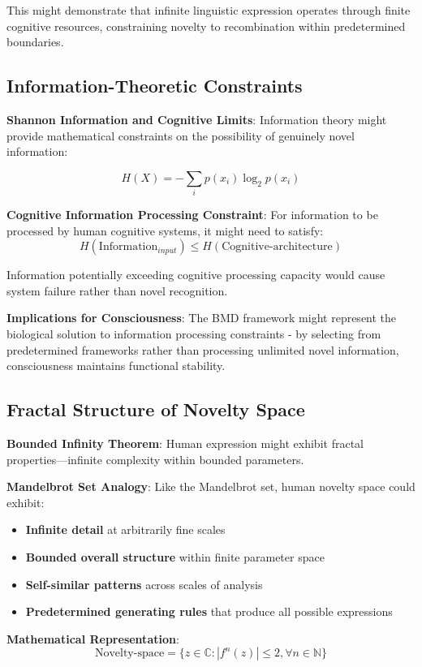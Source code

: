 \documentclass[12pt]{article}
\begin{document}
This might demonstrate that infinite linguistic expression operates through finite cognitive resources, constraining novelty to recombination within predetermined boundaries.

\subsection{Information-Theoretic Constraints}

\textbf{Shannon Information and Cognitive Limits}: Information theory might provide mathematical constraints on the possibility of genuinely novel information:

$$H(X) = -\sum_{i} p(x_i) \log_2 p(x_i)$$

\textbf{Cognitive Information Processing Constraint}: For information to be processed by human cognitive systems, it might need to satisfy:
$$H(\text{Information}_{input}) \leq H(\text{Cognitive-architecture})$$

Information potentially exceeding cognitive processing capacity would cause system failure rather than novel recognition.

\textbf{Implications for Consciousness}: The BMD framework might represent the biological solution to information processing constraints - by selecting from predetermined frameworks rather than processing unlimited novel information, consciousness maintains functional stability.

\subsection{Fractal Structure of Novelty Space}

\textbf{Bounded Infinity Theorem}: Human expression might exhibit fractal properties—infinite complexity within bounded parameters.

\textbf{Mandelbrot Set Analogy}: Like the Mandelbrot set, human novelty space could exhibit:
\begin{itemize}
\item \textbf{Infinite detail} at arbitrarily fine scales
\item \textbf{Bounded overall structure} within finite parameter space
\item \textbf{Self-similar patterns} across scales of analysis
\item \textbf{Predetermined generating rules} that produce all possible expressions
\end{itemize}

\textbf{Mathematical Representation}:
$$\text{Novelty-space} = \{z \in \mathbb{C} : |f^n(z)| \leq 2, \forall n \in \mathbb{N}\}$$
\end{document}
